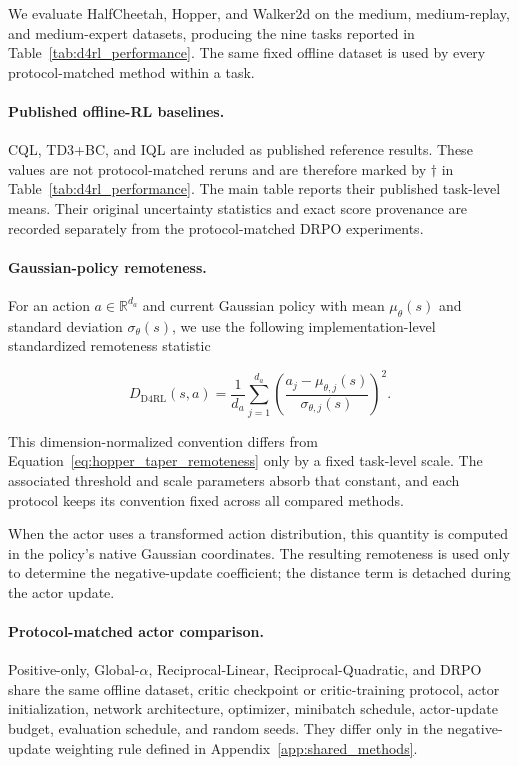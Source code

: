 We evaluate HalfCheetah, Hopper, and Walker2d on the medium,
medium-replay, and medium-expert datasets, producing the nine tasks
reported in Table~\ref{tab:d4rl_performance}. The same fixed offline
dataset is used by every protocol-matched method within a task.

\paragraph{Published offline-RL baselines.}

CQL, TD3+BC, and IQL are included as published reference results.
These values are not protocol-matched reruns and are therefore marked
by \(\dagger\) in Table~\ref{tab:d4rl_performance}. The main table
reports their published task-level means. Their original uncertainty
statistics and exact score provenance are recorded separately from the
protocol-matched DRPO experiments.

\paragraph{Gaussian-policy remoteness.}

For an action \(a\in\mathbb{R}^{d_a}\) and current Gaussian policy with
mean \(\mu_\theta(s)\) and standard deviation \(\sigma_\theta(s)\), we use the
following implementation-level standardized remoteness statistic

\[
D_{\mathrm{D4RL}}(s,a)
=
\frac{1}{d_a}
\sum_{j=1}^{d_a}
\left(
\frac{a_j-\mu_{\theta,j}(s)}
     {\sigma_{\theta,j}(s)}
\right)^2.
\]

This dimension-normalized convention differs from
Equation~\eqref{eq:hopper_taper_remoteness} only by a fixed task-level scale.
The associated threshold and scale parameters absorb that constant, and each
protocol keeps its convention fixed across all compared methods.

When the actor uses a transformed action distribution, this quantity is
computed in the policy's native Gaussian coordinates. The resulting
remoteness is used only to determine the negative-update coefficient;
the distance term is detached during the actor update.

\paragraph{Protocol-matched actor comparison.}

Positive-only, Global-\(\alpha\), Reciprocal-Linear,
Reciprocal-Quadratic, and DRPO share the same offline dataset, critic
checkpoint or critic-training protocol, actor initialization, network
architecture, optimizer, minibatch schedule, actor-update budget,
evaluation schedule, and random seeds. They differ only in the
negative-update weighting rule defined in
Appendix~\ref{app:shared_methods}.

